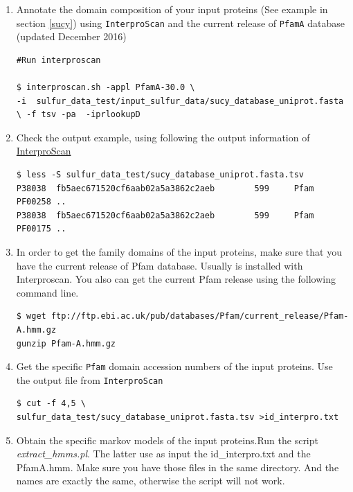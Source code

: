 \documentclass[12pt]{report}
\begin{document}
\begin{enumerate}
\item Annotate the domain composition of your input proteins (See  example in section \ref{sucy}) using \texttt{InterproScan}  and the current release of \texttt{PfamA} database (updated December 2016)

\begin{verbatim}
#Run interproscan 

$ interproscan.sh -appl PfamA-30.0 \
-i  sulfur_data_test/input_sulfur_data/sucy_database_uniprot.fasta 
\ -f tsv -pa  -iprlookupD
\end{verbatim}

\item  Check the output example, using  following the output information of
\href{https://github.com/ebi-pf-team/interproscan/wiki/InterProScan5OutputFormats}{InterproScan}

\begin{verbatim}
$ less -S sulfur_data_test/sucy_database_uniprot.fasta.tsv
P38038  fb5aec671520cf6aab02a5a3862c2aeb        599     Pfam    PF00258 ..
P38038  fb5aec671520cf6aab02a5a3862c2aeb        599     Pfam    PF00175 ..
\end{verbatim}

\item In order to get the family domains of the input  proteins, make sure that you have the current release of Pfam database. Usually is installed with Interproscan. You also can get the current Pfam release using the following command line. 
\begin{verbatim}
$ wget ftp://ftp.ebi.ac.uk/pub/databases/Pfam/current_release/Pfam-A.hmm.gz
gunzip Pfam-A.hmm.gz

\end{verbatim}

\item Get the specific \texttt{Pfam} domain accession numbers of the input proteins. Use the output file from \texttt{InterproScan}
\begin{verbatim}
$ cut -f 4,5 \
sulfur_data_test/sucy_database_uniprot.fasta.tsv >id_interpro.txt 
\end{verbatim}

\item Obtain the specific markov models of the input proteins.Run the script \textit{extract\_hmms.pl}. 
The latter use as input the  id\_interpro.txt  and the  PfamA.hmm. Make sure
you have those files in the same directory. And the names are exactly the same,
otherwise the script will not work.


\end{enumerate}
\end{document}
